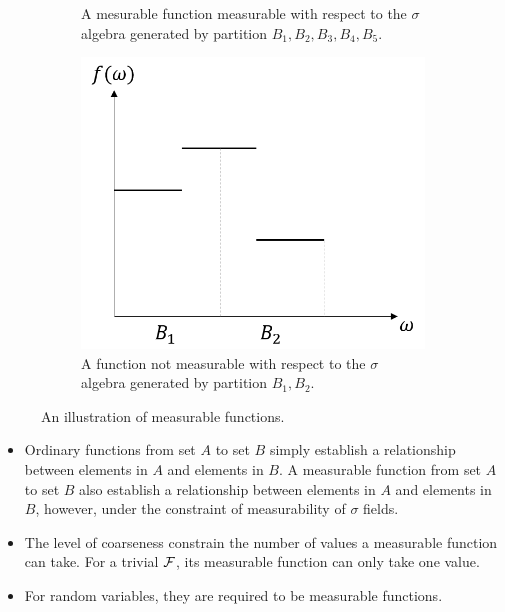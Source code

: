 \begin{refsection}
\begin{figure}[H]
\begin{subfigure}[b]{0.4\textwidth}
		\caption{A mesurable function measurable with respect to the $\sigma$ algebra generated by partition $B_1,B_2,B_3,B_4,B_5$.}
	\end{subfigure}\quad
	\begin{subfigure}[b]{0.4\textwidth}
		\includegraphics[width=\textwidth]{figures/mathFundamentals/measurableFunctionDemo3}
		\caption{A function not measurable with respect to the $\sigma$ algebra generated by partition $B_1,B_2$.}
	\end{subfigure}\quad
	\caption{An illustration of measurable functions.}
\end{figure}

\begin{note}\hfill
\begin{itemize}
	\item Ordinary functions from set $A$ to set $B$ simply establish a relationship between elements in $A$ and elements in $B$. A measurable function from set $A$ to set $B$ also establish a relationship between elements in $A$ and elements in $B$, however, under the constraint of measurability of $\sigma$ fields.
	\item The level of coarseness constrain the number of values a measurable function can take. For a trivial $\mathcal{F}$, its measurable function can only take one value.
	\item For random variables, they are required to be measurable functions.
\end{itemize}	
\end{note}






\end{refsection}
